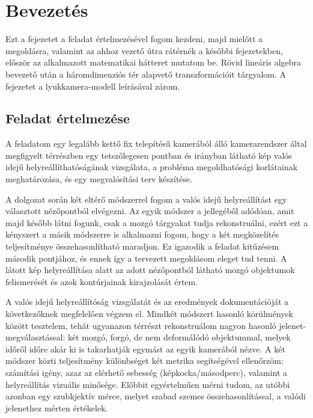 \chapter{Bevezetés}\label{ch:elmelet}

Ezt a fejezetet a feladat értelmezésével fogom kezdeni, majd mielőtt a megoldásra, valamint az ahhoz vezető útra rátérnék a későbbi fejezetekben, először az alkalmazott matematikai hátteret mutatom be. Rövid lineáris algebra bevezető után a háromdimenziós tér alapvető transzformációit tárgyalom. A fejezetet a lyukkamera-modell leírásával zárom.

\section{Feladat értelmezése}

A feladatom egy legalább kettő fix telepítésű kamerából álló kamerarendszer által megfigyelt térrészben egy tetszőlegesen pontban és irányban látható kép valós idejű helyreállíthatóságának vizsgálata, a probléma megoldhatósági korlátainak meghatározása, és egy megvalósítási terv készítése.

A dolgozat során két eltérő módszerrel fogom a valós idejű helyreállítást egy választott nézőpontból elvégezni. Az egyik módszer a jellegéből adódóan, amit majd később látni fogunk, csak a mozgó tárgyakat tudja rekonstruálni, ezért ezt a kényszert a másik módszerre is alkalmazni fogom, hogy a két megközelítés teljesítménye összehasonlítható maradjon. Ez igazodik a feladat kitűzésem második pontjához, és ennek így a tervezett megoldásom eleget tud tenni. A látott kép helyreállítása alatt az adott nézőpontból látható mozgó objektumok felismerését és azok kontúrjainak kirajzolását értem.

A valós idejű helyreállítóság vizsgálatát és az eredmények dokumentációját a következőknek megfelelően végzem el. Mindkét módszert hasonló körülmények között tesztelem, tehát ugyanazon térrészt rekonstruálom nagyon hasonló jelenet-megválasztással: két mozgó, forgó, de nem deformálódó objektummal, melyek időről időre akár ki is takarhatják egymást az egyik kamerából nézve. A két módszer közti teljesítmény különbséget két metrika segítségével ellenőrzöm: számítási igény, azaz az elérhető sebesség (képkocka/másodperc), valamint a helyreállítás vizuális minősége. Előbbit egyértelműen mérni tudom, az utóbbi azonban egy szubkjektív mérce, melyet szabad szemes összehasonlítással, a valódi jelenethez mérten értékelek.

